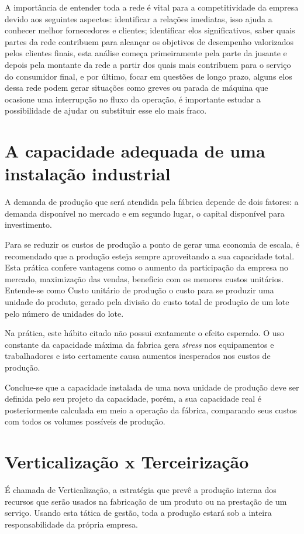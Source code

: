 \par A importância de entender toda a rede é vital para a competitividade da empresa devido aos seguintes aspectos: identificar a relações imediatas, isso ajuda a conhecer melhor fornecedores e clientes; identificar elos significativos, saber quais partes da rede contribuem para alcançar os objetivos de desempenho valorizados pelos clientes finais, esta análise começa primeiramente pela parte da jusante e depois pela montante da rede a partir dos quais mais contribuem para o serviço do consumidor final, e por último, focar em questões de longo prazo, alguns elos dessa rede podem gerar situações como greves ou parada de máquina que ocasione uma interrupção no fluxo da operação, é importante estudar a possibilidade de ajudar ou substituir esse elo mais fraco.

\section{A capacidade adequada de uma instalação industrial}
A demanda de produção que será atendida pela fábrica depende de dois fatores: a demanda disponível no mercado e em segundo lugar, o capital disponível para investimento. 

Para se reduzir os custos de produção a ponto de gerar uma economia de escala, é recomendado que a produção esteja sempre aproveitando a sua capacidade total. Esta prática confere vantagens como o aumento da participação da empresa no mercado, maximização das vendas, beneficio com os menores custos unitários. Entende-se como Custo unitário de produção o custo para se produzir uma unidade do produto, gerado pela divisão do custo total de produção de um lote pelo número de unidades do lote.

Na prática, este hábito citado não possui exatamente o efeito esperado. O uso constante da capacidade máxima da fabrica gera \textit{stress} nos equipamentos e trabalhadores e isto certamente causa aumentos inesperados nos custos de produção.

Conclue-se que a capacidade instalada de uma nova unidade de produção deve ser definida pelo seu projeto da capacidade, porém, a sua capacidade real é posteriormente calculada em meio a operação da fábrica, comparando seus custos com todos os volumes possíveis de produção. 

\section{Verticalização x Terceirização}
É chamada de Verticalização, a estratégia que prevê a produção interna dos recursos que serão usados na fabricação de um produto ou na prestação de um serviço. Usando esta tática de gestão, toda a produção estará sob a inteira responsabilidade da própria empresa.

